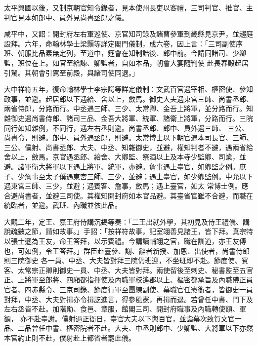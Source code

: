 \begin{pinyinscope}
 太平興國以後，又制京朝官知令錄者，見本使州長吏以客禮，三司判官、推官、主判官見本如郎中、員外見尚書丞郎之儀。



 咸平中，又詔：開封府左右軍巡使、京官知司錄及諸曹參軍到畿縣見京尹，並趨庭設拜。六年，命翰林學士梁顥等詳定閣門儀制，成六卷，因上言：「三司副使序班、朝服比品素無定列，至道中，筵會在知制誥後、郎中前。今請同諸司、少卿監，班位在上。如官至給諫、卿監者，自如本品，朝會大宴隨判使
 赴長春殿起居引駕。其朝會引駕至前殿，與諸司使同退。」



 大中祥符五年，復命翰林學士李宗諤等詳定儀制：文武百官遇宰相、樞密使、參知政事，並避。起居郎以下遇給、舍以上，斂馬。御史大夫遇東宮三師、尚書丞郎、兩省侍郎，分路而行。中丞遇三師、三少、太常卿、金吾上將軍，並分路而行。知雜御史遇尚書侍郎、諸司三品、金吾大將軍、統軍、諸衛上將軍，分路而行。三院同行如知雜例，不同行，遇左右丞則避。尚書丞郎、郎中、員外遇三師、
 三公、尚書令，則避。郎中、員外遇丞郎，則避。太常博士以下朝官遇本司長官、三師、三公、僕射、尚書丞郎、大夫、中丞、知雜御史，並避，權知判者不避，遇兩省給舍以上，斂馬。京官遇丞郎、給舍、大卿監、祭酒以上及本寺少監卿、司業，並避。諸軍衛大將軍以下遇上將軍、統軍，亦避。詹事遇上臺官，如卿監之例。庶子、少詹事至太子僕遇東宮三師、三少，並避；遇上臺官，如少卿監例。中允以下遇東宮三師、三少，並避；遇賓客、詹事，斂馬；遇上臺官，如太
 常博士例。應合避尚書者，並避三司使。其權知開封府如本官品避。其臺省官雖不合避，而職在統臨者，並避。武班、內職並依此品。



 大觀二年，定王、嘉王府侍講沉錫等奏：「二王出就外學，其初見及侍王禮儀、講說疏數之節，請如故事。」手詔：「按祥符故事，記室翊善見諸王，皆下拜。真宗特以張士遜為王友，命王答拜，以示賓禮。今講讀輔翊之官，職在訓道，亦王友傅也，可如例，令王答拜。」群臣赴臺參、謝、辭者新授、加恩、出使者，尚書侍郎則三院御史
 各一員、中丞、大夫皆對拜三院仍班迎，不坐班即不赴。節度使、賓客、太常宗正卿則御史一員、中丞、大夫皆對拜。兩使留後至刺史、秘書監至五官正、上將軍至郎將、四廂都指揮使及內職軍校遙郡以上、樞密都承旨及內職帶正員官者、四赤縣令、三京司錄、節度行軍至團練副使、幕職官任憲銜者，皆御史一員對拜，中丞、大夫對揖亦令揖訖進言，得參風憲，再揖而退。若曾任中書、門下及左右丞皆不赴。加階勛、食邑、章服，館閣三司、開封府職事及內職轉使額、軍額，
 亦不赴臺謝。僕射過正衙日，臺官大夫以下與百官，並詣幕次致賀文官一品、二品曾任中書、樞密院者不赴。大夫、中丞則郎中、少卿監、大將軍以下亦然本官約止則不赴，僕射赴上都省者罷此儀。



\end{pinyinscope}
